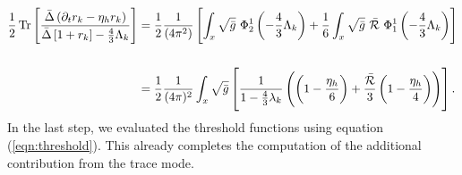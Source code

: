 \begin{align}
\frac{1}{2}\tr{\frac{\bar{\Delta}\left(\partial_tr_k - \eta_h r_k\right)}{\bar{\Delta}\left[1+r_k\right] - \frac{4}{3}\Lambda_k}} &= \frac{1}{2} \frac{1}{\left(4 \pi^{2}\right)}\left[\int_{x} \sqrt{\bar{g}}\ \Phi_{2}^{1}\left(-\frac{4}{3}\Lambda_k\right)+\frac{1}{6} \int_{x} \sqrt{\bar{g}} \ \bar{\mathcal{R}} \ \Phi_{1}^{1}\left(-\frac{4}{3}\Lambda_k\right)\right]\nonumber \\
\phantom{.} \\
&= 	\frac{1}{2}\frac{1}{(4\pi)^2}\int_x\sqrt{\bar{g}}\left[ \frac{1}{1-\frac{4}{3}\lambda_k}\left(\left(1-\frac{\eta_h}{6}\right) + \frac{\bar{\mathcal{R}}}{3}\left(1-\frac{\eta_h}{4}\right)\right)\right].\nonumber
	\end{align}
In the last step, we evaluated the threshold functions using equation (\ref{eqn:threshold}). This already completes the computation of the additional contribution from the trace mode.  
